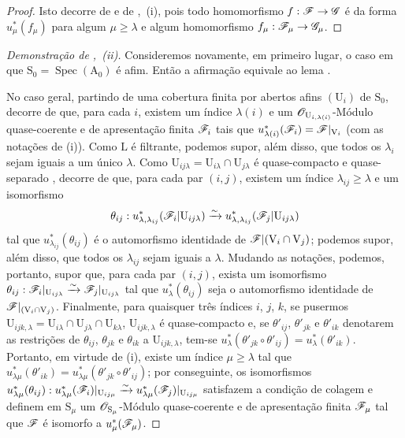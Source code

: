 \begin{proof}
Isto decorre de  e de ,~(i), pois todo homomorfismo $f:\sh{F}\to\sh{G}$ é da forma $u_\mu^*(f_\mu)$ para algum $\mu\geqslant\lambda$ e algum homomorfismo $f_\mu:\sh{F}_\mu\to\sh{G}_\mu$.
\end{proof}

\begin{proof}[Demonstração de ,~(ii)]
Consideremos novamente, em primeiro lugar, o caso em que $\mathrm{S}_0=\operatorname{Spec}(\mathrm{A}_0)$ é afim.
Então a afirmação equivale ao lema .

No caso geral, partindo de uma cobertura finita por abertos afins $(\mathrm{U}_i)$ de $\mathrm{S}_0$, decorre de  que, para cada $i$, existem um índice $\lambda(i)$ e um $\mathscr{O}_{\mathrm{U}_{i,\lambda(i)}}$-Módulo quase-coerente e de apresentação finita $\mathscr{F}_i$ tais que $u_{\lambda(i)}^*(\mathscr{F}_i)=\mathscr{F}|_{\mathrm{V}_i}$ (com as notações de (i)).
Como $\mathrm{L}$ é filtrante, podemos supor, além disso, que todos os $\lambda_i$ sejam iguais a um único $\lambda$.
Como $\mathrm{U}_{ij\lambda}=\mathrm{U}_{i\lambda}\cap\mathrm{U}_{j\lambda}$ é quase-compacto e quase-separado , decorre de  que, para cada par $(i,j)$, existem um índice $\lambda_{ij}\geqslant\lambda$ e um isomorfismo
\[
  \theta_{ij}:u_{\lambda,\lambda_{ij}}^*(\mathscr{F}_i|\mathrm{U}_{ij\lambda})\xrightarrow{\sim}u_{\lambda,\lambda_{ij}}^*(\mathscr{F}_j|\mathrm{U}_{ij\lambda})
\]
tal que $u_{\lambda_{ij}}^*(\theta_{ij})$ é o automorfismo identidade de $\mathscr{F}|(\mathrm{V}_i\cap\mathrm{V}_j)$; podemos supor, além disso, que todos os $\lambda_{ij}$ sejam iguais a $\lambda$.
Mudando as notações, podemos, portanto, supor que, para cada par $(i,j)$, exista um isomorfismo $\theta_{ij}:\mathscr{F}_i|_{\mathrm{U}_{ij\lambda}}\xrightarrow{\sim}\mathscr{F}_j|_{\mathrm{U}_{ij\lambda}}$ tal que $u_\lambda^*(\theta_{ij})$ seja o automorfismo identidade de $\mathscr{F}|_{(\mathrm{V}_i\cap\mathrm{V}_j)}$.
Finalmente, para quaisquer três índices $i$, $j$, $k$, se pusermos $\mathrm{U}_{ijk,\lambda}=\mathrm{U}_{i\lambda}\cap\mathrm{U}_{j\lambda}\cap\mathrm{U}_{k\lambda}$, $\mathrm{U}_{ijk,\lambda}$ é quase-compacto e, se $\theta'_{ij}$, $\theta'_{jk}$ e $\theta'_{ik}$ denotarem as restrições de $\theta_{ij}$, $\theta_{jk}$ e $\theta_{ik}$ a $\mathrm{U}_{ijk,\lambda}$, tem-se $u_\lambda^*(\theta'_{jk}\circ\theta'_{ij})=u_\lambda^*(\theta'_{ik})$.
Portanto, em virtude de (i), existe um índice $\mu\geqslant\lambda$ tal que $u_{\lambda\mu}^*(\theta'_{ik})=u_{\lambda\mu}^*(\theta'_{jk}\circ\theta'_{ij})$; por conseguinte, os isomorfismos $u_{\lambda\mu}^*(\theta_{ij}):u_{\lambda\mu}^*(\mathscr{F}_i)|_{\mathrm{U}_{ij\mu}}\xrightarrow{\sim}u_{\lambda\mu}^*(\mathscr{F}_j)|_{\mathrm{U}_{ij\mu}}$ satisfazem a condição de colagem e definem em $\mathrm{S}_\mu$ um $\mathscr{O}_{\mathrm{S}_\mu}$-Módulo quase-coerente e de apresentação finita $\mathscr{F}_\mu$  tal que $\mathscr{F}$ é isomorfo a $u_\mu^*(\mathscr{F}_\mu)$.
\end{proof}

